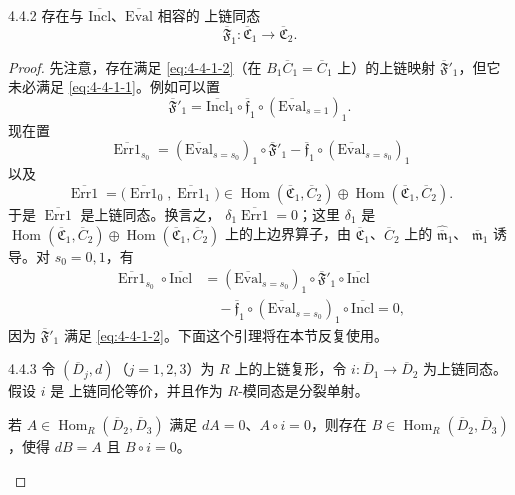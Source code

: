 \begin{lemma}{4.4.2}\label{lem:4-4-2}
存在与 $\overline{\mathrm{Incl}}$、$\overline{\mathrm{Eval}}$ 相容的
上链同态
\[
 \overline{\mathfrak F}_1\colon
 \overline{\mathfrak C}_1\longrightarrow\overline{\mathfrak C}_2.
\]
\end{lemma}

\begin{proof}
先注意，存在满足 \eqref{eq:4-4-1-2}（在
$B_1\overline C_1=\overline C_1$ 上）的上链映射
$\overline{\mathfrak F}'_1$，但它未必满足
\eqref{eq:4-4-1-1}。例如可以置
\[
 \overline{\mathfrak F}'_1
 =\overline{\mathrm{Incl}}_1
 \circ\overline{\mathfrak f}_1
 \circ(\overline{\mathrm{Eval}}_{s=1})_1.
\]
现在置
\[
 \overline{\operatorname{Err1}}_{s_0}
 =(\overline{\mathrm{Eval}}_{s=s_0})_1
 \circ\overline{\mathfrak F}'_1
 -\overline{\mathfrak f}_1
 \circ(\overline{\mathrm{Eval}}_{s=s_0})_1
\]
以及
\[
 \overline{\operatorname{Err1}}
 =\bigl(\overline{\operatorname{Err1}}_0,
 \overline{\operatorname{Err1}}_1\bigr)
 \in
 \operatorname{Hom}(\overline{\mathfrak C}_1,\overline C_2)
 \oplus
 \operatorname{Hom}(\overline{\mathfrak C}_1,\overline C_2).
\]
于是 $\overline{\operatorname{Err1}}$ 是上链同态。换言之，
$\delta_1\overline{\operatorname{Err1}}=0$；这里 $\delta_1$ 是
$\operatorname{Hom}(\overline{\mathfrak C}_1,\overline C_2)
\oplus\operatorname{Hom}(\overline{\mathfrak C}_1,\overline C_2)$
上的上边界算子，由 $\overline{\mathfrak C}_1$、$\overline C_2$ 上的
$\widehat{\overline{\mathfrak m}}_1$、
$\overline{\mathfrak m}_1$ 诱导。对 $s_0=0,1$，有
\[
 \begin{aligned}
 \overline{\operatorname{Err1}}_{s_0}
 \circ\overline{\mathrm{Incl}}
 &=(\overline{\mathrm{Eval}}_{s=s_0})_1
 \circ\overline{\mathfrak F}'_1
 \circ\overline{\mathrm{Incl}}\\
 &\quad{}-\overline{\mathfrak f}_1
 \circ(\overline{\mathrm{Eval}}_{s=s_0})_1
 \circ\overline{\mathrm{Incl}}
 =0,
 \end{aligned}
\]
因为 $\overline{\mathfrak F}'_1$ 满足
\eqref{eq:4-4-1-2}。下面这个引理将在本节反复使用。

\begin{lemma}{4.4.3}\label{lem:4-4-3}
令 $(\overline D_j,d)$（$j=1,2,3$）为 $R$ 上的上链复形，令
$i\colon\overline D_1\to\overline D_2$ 为上链同态。假设 $i$ 是
上链同伦等价，并且作为 $R$-模同态是分裂单射。

若 $A\in\operatorname{Hom}_R(\overline D_2,\overline D_3)$ 满足
$dA=0$、$A\circ i=0$，则存在
$B\in\operatorname{Hom}_R(\overline D_2,\overline D_3)$，使得
$dB=A$ 且 $B\circ i=0$。
\end{lemma}


\end{proof}
